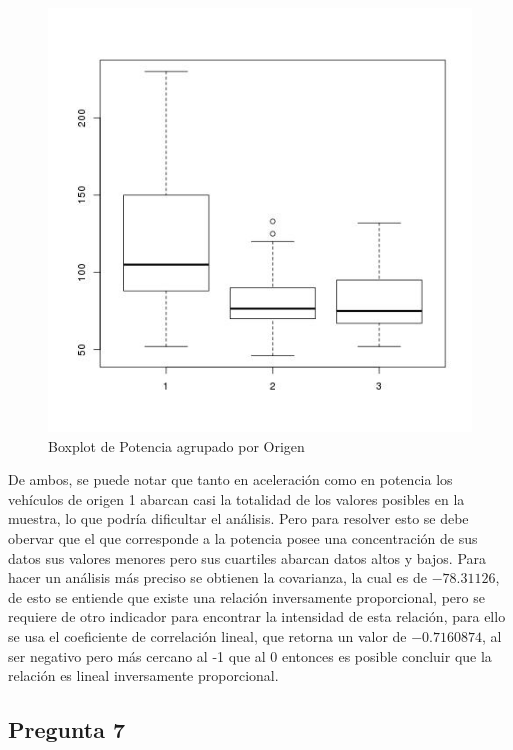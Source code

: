 \documentclass[letter,10pt]{article}
\begin{document}
\begin{minipage}{\linewidth}
\begin{minipage}{0.45\linewidth}
\begin{figure}[H]
              \includegraphics[width=\linewidth]{boxplot_horsepower_origin.jpg}
              \caption{Boxplot de Potencia agrupado por Origen}
          \end{figure}
      \end{minipage}
  \end{minipage}
De ambos, se puede notar que  tanto en aceleración como en potencia los vehículos de origen 1 abarcan casi la totalidad de los
valores posibles en la muestra, lo que podría dificultar el análisis. Pero para resolver esto se debe obervar que el que corresponde a la potencia
posee una concentración de sus datos sus valores menores pero sus cuartiles abarcan datos altos y bajos.
Para hacer un análisis más preciso se obtienen la covarianza, la cual es de $-78.31126$, de esto se entiende que existe una relación inversamente proporcional,
pero se requiere de otro indicador para encontrar la intensidad de esta relación, para ello se usa el coeficiente de correlación lineal, que retorna un valor de 
$-0.7160874$, al ser negativo pero más cercano al -1 que al 0 entonces es posible concluir que la relación es lineal inversamente proporcional.

\newpage
\subsection{Pregunta 7}
\end{document}
